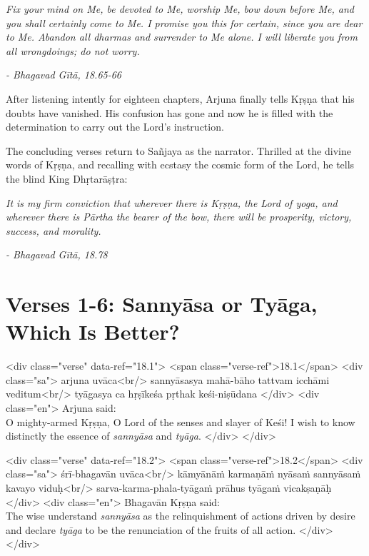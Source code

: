 \begin{customquote}\fontsize{10}{11}\selectfont
\textit{Fix your mind on Me, be devoted to Me, worship Me, bow down before Me, and you shall certainly come to Me. I promise you this for certain, since you are dear to Me. Abandon all \textit{dharmas} and surrender to Me alone. I will liberate you from all wrongdoings; do not worry.}

\textit{- Bhagavad Gītā, 18.65-66}
\end{customquote}

After listening intently for eighteen chapters, Arjuna finally tells Kṛṣṇa that his doubts have vanished. His confusion has gone and now he is filled with the determination to carry out the Lord’s instruction.

The concluding verses return to Sañjaya as the narrator. Thrilled at the divine words of Kṛṣṇa, and recalling with ecstasy the cosmic form of the Lord, he tells the blind King Dhṛtarāṣṭra:

\begin{customquote}\fontsize{10}{11}\selectfont
\textit{It is my firm conviction that wherever there is Kṛṣṇa, the Lord of \textit{yoga}, and wherever there is Pārtha the bearer of the bow, there will be prosperity, victory, success, and morality.}

\textit{- Bhagavad Gītā, 18.78}
\end{customquote}



\section{Verses 1-6: Sannyāsa or Tyāga, Which Is Better?}\label{sec-verses-1-6-sannyasa-or-tyaga-which-is-better}


\begin{html}
<div class="verse" data-ref="18.1">
  <span class="verse-ref">18.1</span>
  <div class="sa">
    arjuna uvāca<br/>
    sannyāsasya mahā-bāho tattvam icchāmi veditum<br/>
    tyāgasya ca hṛṣīkeśa pṛthak keśi-niṣūdana
  </div>
  <div class="en">
    \hspace*{1em}Arjuna said: \\ O mighty-armed Kṛṣṇa, O Lord of the senses and slayer of Keśi! I wish to know distinctly the essence of \textit{sannyāsa} and \textit{tyāga}.
  </div>
</div>
\end{html}



\begin{html}
<div class="verse" data-ref="18.2">
  <span class="verse-ref">18.2</span>
  <div class="sa">
    śrī-bhagavān uvāca<br/>
    kāmyānāṁ karmaṇāṁ nyāsaṁ sannyāsaṁ kavayo viduḥ<br/>
    sarva-karma-phala-tyāgaṁ prāhus tyāgaṁ vicakṣaṇāḥ
  </div>
  <div class="en">
    \hspace*{1em}Bhagavān Kṛṣṇa said: \\ The wise understand \textit{sannyāsa} as the relinquishment of actions driven by desire and declare \textit{tyāga} to be the renunciation of the fruits of all action.
  </div>
</div>
\end{html}



